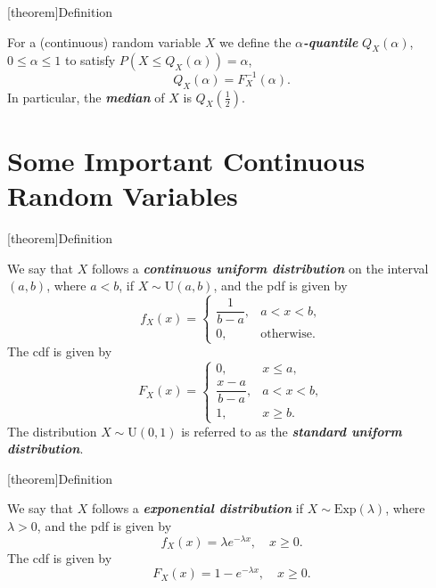 \documentclass[12pt]{report}
\theoremstyle{definition}
\begin{document}
[theorem]{Definition}
\begin{quantiles}
    For a (continuous) random variable $X$ we define the
    \textbf{\emph{$\alpha$-quantile}} $Q_X(\alpha)$,
    $0\le\alpha\le 1$ to satisfy $P(X\le Q_X(\alpha))=\alpha$,
    \[
        Q_X(\alpha)=F_X^{-1}(\alpha).
    \]
    In particular, the \textbf{\emph{median}} of $X$ is
    $Q_X\left(\frac{1}{2}\right)$.
\end{quantiles}

\section{Some Important Continuous Random Variables}

[theorem]{Definition}
\begin{continuous uniform distribution}
    We say that $X$ follows a \textbf{\emph{continuous uniform distribution}} 
    on the interval $(a,b)$, where $a<b$, if
    $X\sim\text{U}(a,b)$, and the pdf is
    given by
    \[
        f_X(x)=
        \begin{cases}
            \dfrac{1}{b-a}, & a<x<b, \\[10pt]
            0, & \text{otherwise}.
        \end{cases} 
    \]
    The cdf is given by
    \[
        F_X(x)=
        \begin{cases}
            0, & x\le a, \\[5pt]
            \dfrac{x-a}{b-a}, & a<x<b, \\[10pt]
            1, & x\ge b.
        \end{cases} 
    \]
    The distribution $X\sim\text{U}(0,1)$ is referred to as the
    \textbf{\emph{standard uniform distribution}}.
\end{continuous uniform distribution}

[theorem]{Definition}
\begin{exponential distribution}
    We say that $X$ follows a \textbf{\emph{exponential distribution}} if
    $X\sim\text{Exp}(\lambda)$, where $\lambda>0$, and the pdf is given by
    \[
        f_X(x)=\lambda e^{-\lambda x}, \quad x\ge 0.
    \]
    The cdf is given by
    \[
        F_X(x)=1-e^{-\lambda x},\quad x\ge 0.
    \]
\end{exponential distribution}
\end{document}
